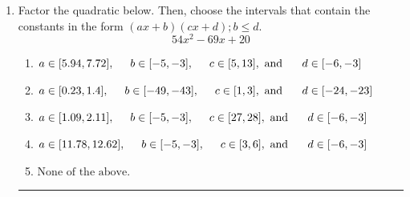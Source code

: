 \documentclass[14pt]{extbook}
\newcommand{\litem}[1]{\item#1\hspace*{-1cm}\rule{\textwidth}{0.4pt}}
\begin{document}
\begin{enumerate}
{\begin{enumerate}[label=\Alph*.]
\end{enumerate} }
\litem{
Factor the quadratic below. Then, choose the intervals that contain the constants in the form $(ax+b)(cx+d); b \leq d.$\[ 54x^{2} -69 x + 20 \]\begin{enumerate}[label=\Alph*.]
\item \( a \in [5.94, 7.72], \hspace*{5mm} b \in [-5, -3], \hspace*{5mm} c \in [5, 13], \text{ and } \hspace*{5mm} d \in [-6, -3] \)
\item \( a \in [0.23, 1.4], \hspace*{5mm} b \in [-49, -43], \hspace*{5mm} c \in [1, 3], \text{ and } \hspace*{5mm} d \in [-24, -23] \)
\item \( a \in [1.09, 2.11], \hspace*{5mm} b \in [-5, -3], \hspace*{5mm} c \in [27, 28], \text{ and } \hspace*{5mm} d \in [-6, -3] \)
\item \( a \in [11.78, 12.62], \hspace*{5mm} b \in [-5, -3], \hspace*{5mm} c \in [3, 6], \text{ and } \hspace*{5mm} d \in [-6, -3] \)
\item \( \text{None of the above.} \)


\end{enumerate}}
\end{enumerate}
\end{document}

